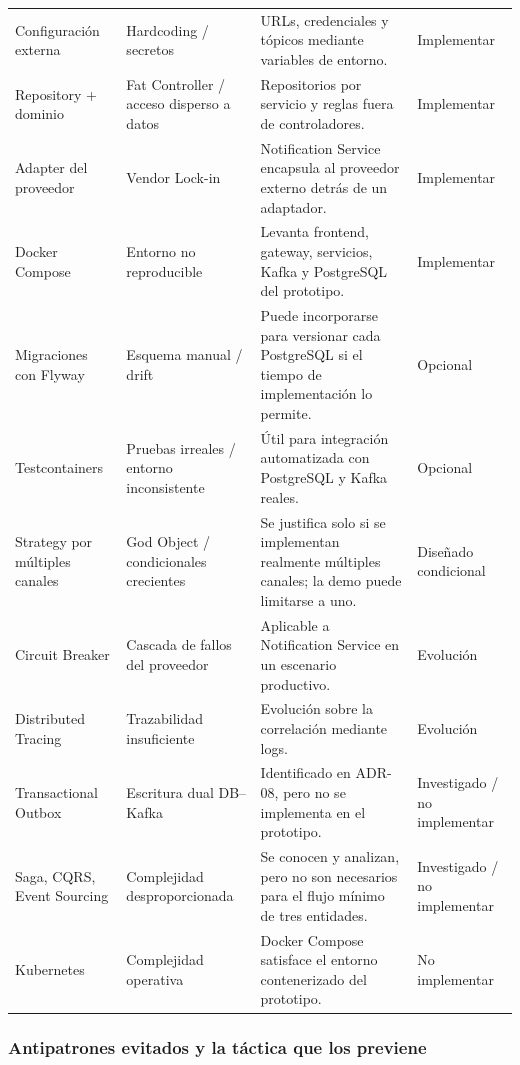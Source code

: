 \documentclass[12pt,a4paper]{article}
\begin{document}
\begin{longtable}{P{0.19\textwidth} P{0.22\textwidth} P{0.36\textwidth} P{0.13\textwidth}}
Configuración externa & Hardcoding / secretos & URLs, credenciales y tópicos mediante variables de entorno. & Implementar \\
Repository + dominio & Fat Controller / acceso disperso a datos & Repositorios por servicio y reglas fuera de controladores. & Implementar \\
Adapter del proveedor & Vendor Lock-in & Notification Service encapsula al proveedor externo detrás de un adaptador. & Implementar \\
Docker Compose & Entorno no reproducible & Levanta frontend, gateway, servicios, Kafka y PostgreSQL del prototipo. & Implementar \\
Migraciones con Flyway & Esquema manual / drift & Puede incorporarse para versionar cada PostgreSQL si el tiempo de implementación lo permite. & Opcional \\
Testcontainers & Pruebas irreales / entorno inconsistente & Útil para integración automatizada con PostgreSQL y Kafka reales. & Opcional \\
Strategy por múltiples canales & God Object / condicionales crecientes & Se justifica solo si se implementan realmente múltiples canales; la demo puede limitarse a uno. & Diseñado condicional \\
Circuit Breaker & Cascada de fallos del proveedor & Aplicable a Notification Service en un escenario productivo. & Evolución \\
Distributed Tracing & Trazabilidad insuficiente & Evolución sobre la correlación mediante logs. & Evolución \\
Transactional Outbox & Escritura dual DB--Kafka & Identificado en ADR-08, pero no se implementa en el prototipo. & Investigado / no implementar \\
Saga, CQRS, Event Sourcing & Complejidad desproporcionada & Se conocen y analizan, pero no son necesarios para el flujo mínimo de tres entidades. & Investigado / no implementar \\
Kubernetes & Complejidad operativa & Docker Compose satisface el entorno contenerizado del prototipo. & No implementar \\
\bottomrule
\end{longtable}
\setlength{\tabcolsep}{6pt}
\normalsize

\subsubsection{Antipatrones evitados y la táctica que los previene}
\end{document}
